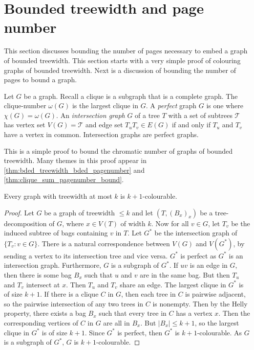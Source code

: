 
\section{Bounded treewidth and page number}\label{sec:Bounded_Treewidth}

This section discusses bounding the number of pages necessary to embed a graph of bounded treewidth. This section starts with a very simple proof of colouring graphs of bounded treewidth. Next is a discussion of bounding the number of pages to bound a graph. 

Let $G$ be a graph. Recall a clique is a subgraph that is a complete graph. The clique-number $\omega(G)$ is the largest clique in $G$. A \textit{perfect} graph $G$ is one where $\chi(G) = \omega(G)$. An \textit{intersection graph} $G$ of a tree $T$ with a set of subtrees $\mathcal{T}$ has vertex set $V(G) = \mathcal{T}$ and edge set $T_u T_v \in E(G)$ if and only if $T_u$ and $T_v$ have a vertex in common. Intersection graphs are perfect graphs. 

This is a simple proof to bound the chromatic number of graphs of bounded treewidth. Many themes in this proof appear in \cref{thm:bded_treewidth_bded_pagenumber} and \cref{thm:clique_sum_pagenumber_bound}. 
\begin{theorem}
	Every graph with treewidth at most $k$ is $k + 1$-colourable.
\end{theorem}

\begin{proof}
	Let $G$ be a graph of treewidth $\leq k$ and let $(T, (B_x)_x)$ be a tree-decomposition of $G$, where $x \in V(T)$ of width $k$. Now for all $v \in G$, let $T_v$ be the induced subtree of bags containing $v$ in $T$. Let $G^*$ be the intersection graph of $\{T_v : v \in G\}$. There is a natural correspondence between $V(G)$ and $V(G^*)$, by sending a vertex to its intersection tree and vice versa. $G^*$ is perfect as $G^*$ is an intersection graph. Furthermore, $G$ is a subgraph of $G^*$. If $uv$ is an edge in $G$, then there is some bag $B_x$ such that $u$ and $v$ are in the same bag. But then $T_u$ and $T_v$ intersect at $x$. Then $T_u$ and $T_v$ share an edge. The largest clique in $G^*$ is of size $k + 1$. If there is a clique $C$ in $G$, then each tree in $C$ is pairwise adjacent, so the pairwise intersection of any two trees in $C$ is nonempty. Then by the Helly property, there exists a bag $B_x$ such that every tree in $C$ has a vertex $x$. Then the corresponding vertices of $C$ in $G$ are all in $B_x$. But $|B_x| \leq k + 1$, so the largest clique in $G^*$ is of size $k + 1$. Since $G^*$ is perfect, then $G^*$ is $k + 1$-colourable. As $G$ is a subgraph of $G^*$, $G$ is $k + 1$-colourable. 
\end{proof}


